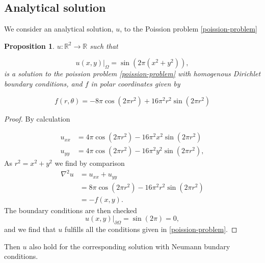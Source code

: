 \documentclass[5pt,a4paper,english]{elsarticle}%
\newcommand{\restr}[2]{\ensuremath{\left.#1\right|_{#2}}}
\newtheorem{proposition}[theorem]{Proposition}
\begin{document}
\subsection{Analytical solution}
We consider an analytical solution, $u$, to the Poission problem \eqref{poission-problem}
\begin{proposition}\label{prop-analytical-solution}
    $u: \mathbb{R}^2 \rightarrow \mathbb{R}$ such that

    \begin{equation}
    \restr{u(x,y)}{\Omega} = \sin(2\pi (x^2 + y^2)),
    \label{analytical-solution}
    \end{equation}
    is a solution to the poission problem \eqref{poission-problem} with homogenous Dirichlet boundary conditions, and  $f$ in polar coordinates given by

    \begin{equation}
    f(r,\theta) = -8\pi\cos(2\pi r^2) + 16 \pi^2r^2 \sin(2\pi r^2)
    \label{f-analytic}
    \end{equation}
\end{proposition}
\begin{proof}
By calculation

\begin{equation*}
\begin{aligned}
 u_{xx} &= 4\pi\cos(2\pi r^2) - 16\pi^2x^2\sin(2\pi r^2)
\\
u_{yy} &= 4\pi\cos(2\pi r^2) - 16\pi^2y^2\sin(2\pi r^2),
\end{aligned}
\end{equation*}
As $r^2 = x^2 + y^2$ we find by comparison
\begin{equation*}
\begin{aligned}
\nabla^2 u &= u_{xx} + u_{yy}\\
&= 8\pi \cos(2\pi r^2) - 16\pi^2r^2\sin(2\pi r^2)\\
& = -f(x,y).
\end{aligned}
\end{equation*}
The boundary conditions are then checked
\begin{equation*}
    \restr{u(x,y)}{\partial\Omega} = \sin(2\pi) = 0,
\end{equation*}
and we find that $u$ fulfills all the conditions given in \eqref{poission-problem}. 
\end{proof}
\noindent Then $u$ also hold for the corresponding solution with Neumann bundary conditions. 
\end{document}
